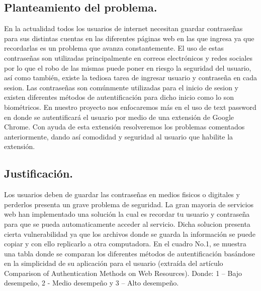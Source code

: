 \documentclass[12pt, a4paper, titlepage]{article}
\begin{document}
		\subsection{Planteamiento del problema.}
			En la actualidad todos los usuarios de internet necesitan guardar contraseñas para sus distintas cuentas en las diferentes páginas web en las que ingresa ya que recordarlas es un problema que avanza constantemente. El uso de estas contraseñas son utilizadas principalmente en correos electrónicos y redes sociales por lo que el robo de las mismas puede poner en riesgo la seguridad del usuario, así como también, existe la tediosa tarea de ingresar usuario y contraseña en cada sesion. Las contraseñas son comúnmente utilizadas para el inicio de sesion y existen diferentes métodos de autentificación para dicho inicio como lo son biométricos. En nuestro proyecto nos enfocaremos más en el uso de text password en donde se autentificará el usuario por medio de una extensión de Google Chrome. Con ayuda de esta extensión resolveremos los problemas comentados anteriormente, dando así comodidad y seguridad al usuario que habilite la extensión.
		\newpage    
		\subsection{Justificación.}
			Los usuarios deben de guardar las contraseñas en medios fisicos o digitales y perderlos presenta un grave problema de seguridad. La gran mayoria de servicios web han implementado una solución la cual es recordar tu usuario y contraseña para que se pueda automaticamente acceder al servicio. Dicha solucion presenta cierta vulnerabilidad ya que los archivos donde se guarda la información se puede copiar y con ello replicarlo a otra computadora.
			En el cuadro No.1, se muestra una tabla donde se comparan los diferentes métodos de autentificación basándose en la simplicidad de su aplicación para el usuario (extraída del artículo Comparison of Authentication Methods on Web Resources). Donde: 1 – Bajo desempeño, 2 - Medio desempeño y 3 – Alto desempeño.
			
\end{document}
